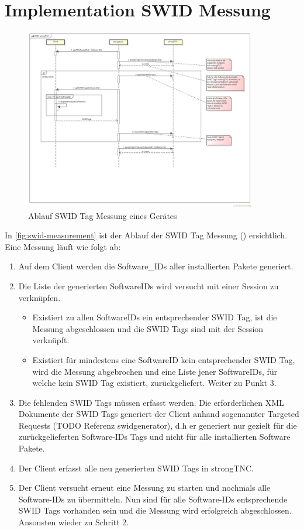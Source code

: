 \section{Implementation SWID Messung}
\begin{figure}[H]
\centering
\includegraphics[width=0.9\textwidth]{./images/architecture/SWID_strongTNC.png}
\caption{Ablauf SWID Tag Messung eines Gerätes}
\label{fig:swid-measurement}
\end{figure}
In \autoref{fig:swid-measurement} ist der Ablauf der SWID Tag Messung () ersichtlich.
Eine Messung läuft wie folgt ab:
\begin{enumerate}
\item Auf dem Client werden die Software\_IDs aller installierten Pakete generiert. 
\item Die Liste der generierten Software\-IDs wird versucht mit einer Session zu verknüpfen.
	\begin{itemize}
	\item Existiert zu allen Software\-IDs ein entsprechender SWID Tag, ist die Messung abgeschlossen und die SWID Tags sind mit der Session verknüpft.
	\item Existiert für mindestens eine Software\-ID kein entsprechender SWID Tag, wird die Messung abgebrochen und eine Liste jener Software\-IDs, für welche kein SWID Tag existiert, zurückgeliefert. Weiter zu Punkt 3.
	\end{itemize}
\item Die fehlenden SWID Tags müssen erfasst werden. Die erforderlichen XML Dokumente der SWID Tags generiert der Client anhand sogenannter Targeted Requests (TODO Referenz swidgenerator), d.h er generiert nur gezielt für die zurückgelieferten Software-IDs Tags und nicht für alle installierten Software Pakete.
\item Der Client erfasst alle neu generierten SWID Tags in strongTNC.
\item Der Client versucht erneut eine Messung zu starten und nochmals alle Software-IDs zu übermitteln. Nun sind für alle Software-IDs entsprechende SWID Tags vorhanden sein und die Messung wird erfolgreich abgeschlossen. Ansonsten wieder zu Schritt 2.
\end{enumerate}
